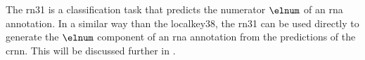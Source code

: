 
The \gls{rn31} is a classification task that predicts the
numerator $\elnum$ of an \gls{rna} annotation. In a similar
way than the \gls{localkey38}, the \gls{rn31} can be used
directly to generate the $\elnum$ component of an \gls{rna}
annotation from the predictions of the \gls{crnn}. This will
be discussed further in .


